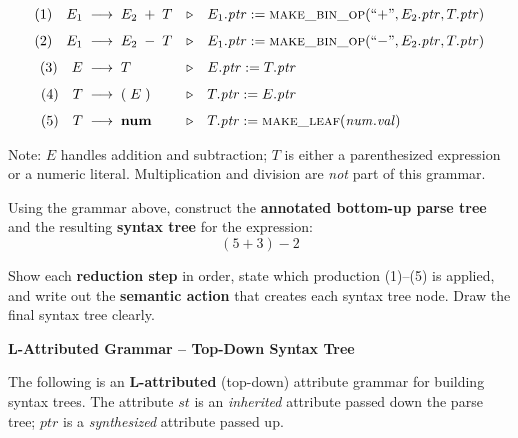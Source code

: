 \documentclass[12pt]{exam}
\begin{document}
\begin{questions}
\begin{align*}
  (1)\quad E_1 &\;\longrightarrow\; E_2 \;+\; T
    &\triangleright\quad& E_1.\mathit{ptr} := \textsc{make\_bin\_op}(\text{``+''}, E_2.\mathit{ptr}, T.\mathit{ptr}) \\[4pt]
  (2)\quad E_1 &\;\longrightarrow\; E_2 \;-\; T
    &\triangleright\quad& E_1.\mathit{ptr} := \textsc{make\_bin\_op}(\text{``$-$''}, E_2.\mathit{ptr}, T.\mathit{ptr}) \\[4pt]
  (3)\quad E   &\;\longrightarrow\; T
    &\triangleright\quad& E.\mathit{ptr} := T.\mathit{ptr} \\[4pt]
  (4)\quad T   &\;\longrightarrow\; (\; E \;)
    &\triangleright\quad& T.\mathit{ptr} := E.\mathit{ptr} \\[4pt]
  (5)\quad T   &\;\longrightarrow\; \textbf{num}
    &\triangleright\quad& T.\mathit{ptr} := \textsc{make\_leaf}(\mathit{num.val})
\end{align*}

\medskip
\noindent Note: $E$ handles addition and subtraction; $T$ is either a
parenthesized expression or a numeric literal.
Multiplication and division are \emph{not} part of this grammar.

\medskip
\noindent Using the grammar above, construct the \textbf{annotated bottom-up parse
tree} and the resulting \textbf{syntax tree} for the expression:
\[
  (5 + 3) - 2
\]

\medskip
\noindent Show each \textbf{reduction step} in order, state which production
(1)--(5) is applied, and write out the \textbf{semantic action} that creates
each syntax tree node. Draw the final syntax tree clearly.

\vspace{12cm}

\newpage

\question[15]
\textbf{L-Attributed Grammar -- Top-Down Syntax Tree}

\medskip
\noindent The following is an \textbf{L-attributed} (top-down) attribute grammar
for building syntax trees.  The attribute $\mathit{st}$ is an
\emph{inherited} attribute passed down the parse tree; $\mathit{ptr}$ is a
\emph{synthesized} attribute passed up.


\end{questions}
\end{document}
